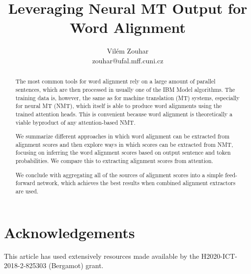 \documentclass[11pt,a4paper]{article}
\title{Leveraging Neural MT Output for Word Alignment}
\author{Vilém Zouhar \\ zouhar@ufal.mff.cuni.cz}
\begin{document}


\maketitle

\begin{abstract}
The most common tools for word alignment rely on a large amount of parallel sentences, which are then processed in usually one of the IBM Model algorithms. The training data is, however, the same as for machine translation (MT) systems, especially for neural MT (NMT), which itself is able to produce word alignments using the trained attention heads. This is convenient because word alignment is theoretically a viable byproduct of any attention-based NMT.

We summarize different approaches in which word alignment can be extracted from alignment scores and then explore ways in which scores can be extracted from NMT, focusing on inferring the word alignment scores based on output sentence and token probabilities. We compare this to extracting alignment scores from attention.

We conclude with aggregating all of the sources of alignment scores into a simple feed-forward network, which achieves the best results when combined alignment extractors are used.
\end{abstract}






\section*{Acknowledgements}

This article has used extensively resources made available by the H2020-ICT-2018-2-825303 (Bergamot) grant.



\end{document}
